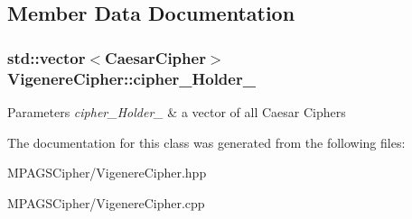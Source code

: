 \subsection{Member Data Documentation}
\hypertarget{class_vigenere_cipher_a689c8803694f5ed4284f38f090540c89}{
\subsubsection[{cipher\-\_\-\-Holder\-\_\-}]{\setlength{\rightskip}{0pt plus 5cm}std\-::vector$<${\bf Caesar\-Cipher}$>$ Vigenere\-Cipher\-::cipher\-\_\-\-Holder\-\_\-}}\label{class_vigenere_cipher_a689c8803694f5ed4284f38f090540c89}

\begin{DoxyParams}{Parameters}
{\em cipher\-\_\-\-Holder\-\_\-} & a vector of all Caesar Ciphers \\
\hline
\end{DoxyParams}


The documentation for this class was generated from the following files\-:\begin{DoxyCompactItemize}
\item 
M\-P\-A\-G\-S\-Cipher/Vigenere\-Cipher.\-hpp\item 
M\-P\-A\-G\-S\-Cipher/Vigenere\-Cipher.\-cpp\end{DoxyCompactItemize}
